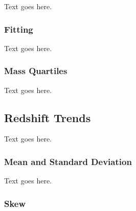Text goes here.



\subsubsection{Fitting}
\label{subsubsec:analysis--difference_histograms--fitting}


Text goes here.



\subsubsection{Mass Quartiles}
\label{subsubsec:analysis--difference_histograms--mass_quartiles}


Text goes here.




\subsection{Redshift Trends}
\label{subsec:analysis--redshift_trends}


Text goes here.



\subsubsection{Mean and Standard Deviation}
\label{subsubsec:analysis--redshift_trends--mean_stdev}


Text goes here.



\subsubsection{Skew}
\label{subsubsec:analysis--redshift_trends--skew}


